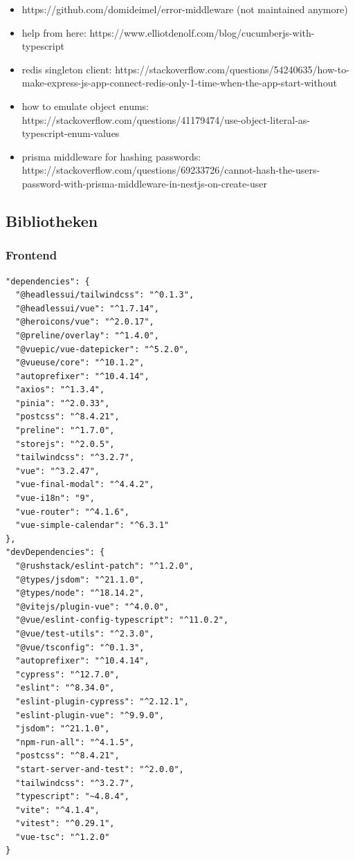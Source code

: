 \documentclass[a4paper, 12pt]{article}
\begin{document}
\begin{itemize}
  \item https://github.com/domideimel/error-middleware  (not maintained anymore)
  \item help from here: https://www.elliotdenolf.com/blog/cucumberjs-with-typescript
  \item redis singleton client: https://stackoverflow.com/questions/54240635/how-to-make-express-js-app-connect-redis-only-1-time-when-the-app-start-without
  \item how to emulate object enums: https://stackoverflow.com/questions/41179474/use-object-literal-as-typescript-enum-values
  \item prisma middleware for hashing passwords: https://stackoverflow.com/questions/69233726/cannot-hash-the-users-password-with-prisma-middleware-in-nestjs-on-create-user
\end{itemize}

    \newpage
    \subsection{Bibliotheken}
    \subsubsection{Frontend}

    \begin{verbatim}
"dependencies": {
  "@headlessui/tailwindcss": "^0.1.3",
  "@headlessui/vue": "^1.7.14",
  "@heroicons/vue": "^2.0.17",
  "@preline/overlay": "^1.4.0",
  "@vuepic/vue-datepicker": "^5.2.0",
  "@vueuse/core": "^10.1.2",
  "autoprefixer": "^10.4.14",
  "axios": "^1.3.4",
  "pinia": "^2.0.33",
  "postcss": "^8.4.21",
  "preline": "^1.7.0",
  "storejs": "^2.0.5",
  "tailwindcss": "^3.2.7",
  "vue": "^3.2.47",
  "vue-final-modal": "^4.4.2",
  "vue-i18n": "9",
  "vue-router": "^4.1.6",
  "vue-simple-calendar": "^6.3.1"
},
"devDependencies": {
  "@rushstack/eslint-patch": "^1.2.0",
  "@types/jsdom": "^21.1.0",
  "@types/node": "^18.14.2",
  "@vitejs/plugin-vue": "^4.0.0",
  "@vue/eslint-config-typescript": "^11.0.2",
  "@vue/test-utils": "^2.3.0",
  "@vue/tsconfig": "^0.1.3",
  "autoprefixer": "^10.4.14",
  "cypress": "^12.7.0",
  "eslint": "^8.34.0",
  "eslint-plugin-cypress": "^2.12.1",
  "eslint-plugin-vue": "^9.9.0",
  "jsdom": "^21.1.0",
  "npm-run-all": "^4.1.5",
  "postcss": "^8.4.21",
  "start-server-and-test": "^2.0.0",
  "tailwindcss": "^3.2.7",
  "typescript": "~4.8.4",
  "vite": "^4.1.4",
  "vitest": "^0.29.1",
  "vue-tsc": "^1.2.0"
}
    \end{verbatim}
\end{document}

